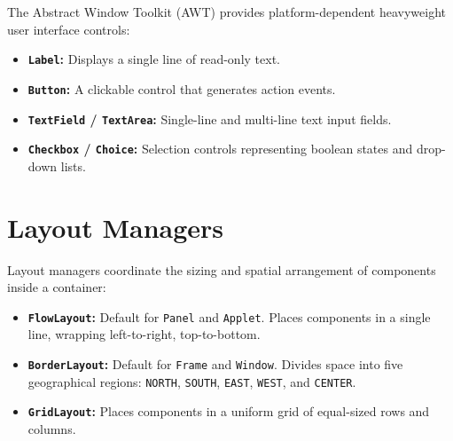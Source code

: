 \documentclass[12pt,a4paper]{article}
\begin{document}
The Abstract Window Toolkit (AWT) provides platform-dependent heavyweight user interface controls:
\begin{itemize}[leftmargin=*, itemsep=3.5pt]
  \item \textbf{\texttt{Label}:} Displays a single line of read-only text.
  \item \textbf{\texttt{Button}:} A clickable control that generates action events.
  \item \textbf{\texttt{TextField} / \texttt{TextArea}:} Single-line and multi-line text input fields.
  \item \textbf{\texttt{Checkbox} / \texttt{Choice}:} Selection controls representing boolean states and drop-down lists.
\end{itemize}

\begin{tcolorbox}[tikzbox, title={AWT Component Class Hierarchy}]
\centering
{}
\end{tcolorbox}

\section{Layout Managers}

Layout managers coordinate the sizing and spatial arrangement of components inside a container:
\begin{itemize}[leftmargin=*, itemsep=3.5pt]
  \item \textbf{\texttt{FlowLayout}:} Default for \texttt{Panel} and \texttt{Applet}. Places components in a single line, wrapping left-to-right, top-to-bottom.
  \item \textbf{\texttt{BorderLayout}:} Default for \texttt{Frame} and \texttt{Window}. Divides space into five geographical regions: \texttt{NORTH}, \texttt{SOUTH}, \texttt{EAST}, \texttt{WEST}, and \texttt{CENTER}.
  \item \textbf{\texttt{GridLayout}:} Places components in a uniform grid of equal-sized rows and columns.
\end{itemize}
\end{document}
